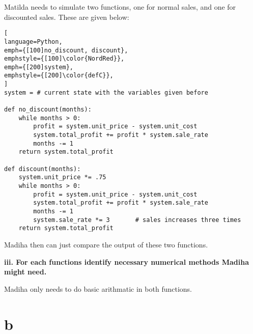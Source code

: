\documentclass[article, 11pt, a4paper]{memoir}
\begin{document}
\begin{solution}
    [a.ii]
    Matilda needs to simulate two functions, one for normal sales, and one for
    discounted sales. These are given below:

\begin{lstlisting}[
language=Python,
emph={[100]no_discount, discount},
emphstyle={[100]\color{NordRed}},
emph={[200]system},
emphstyle={[200]\color{defC}},
]
system = # current state with the variables given before

def no_discount(months):
    while months > 0:
        profit = system.unit_price - system.unit_cost
        system.total_profit += profit * system.sale_rate
        months -= 1
    return system.total_profit

def discount(months):
    system.unit_price *= .75
    while months > 0:
        profit = system.unit_price - system.unit_cost
        system.total_profit += profit * system.sale_rate
        months -= 1
        system.sale_rate *= 3       # sales increases three times
    return system.total_profit      
\end{lstlisting}

    Madiha then can just compare the output of these two functions.
\end{solution}


\textbf{iii. For each functions identify necessary numerical methods Madiha might need.}
\vspace{1em}

\begin{solution}
    [a.iii]
    Madiha only needs to do basic arithmatic in both functions.
\end{solution}


\section{b}
\end{document}
